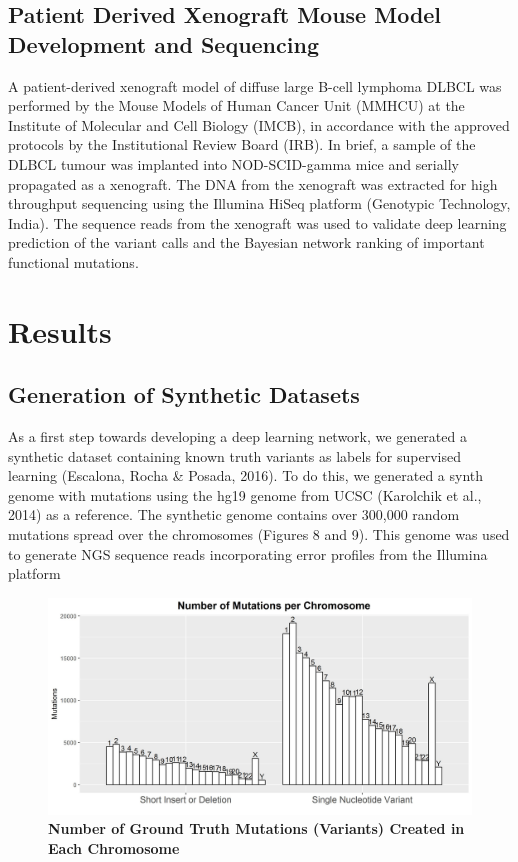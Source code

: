 \documentclass{article}
\begin{document}
\subsection{Patient Derived Xenograft Mouse Model Development and Sequencing}
A patient-derived xenograft model of diffuse large B-cell lymphoma DLBCL was performed by the Mouse Models of Human Cancer Unit (MMHCU) at the Institute of Molecular and Cell Biology (IMCB), in accordance with the approved protocols by the Institutional Review Board (IRB). In brief, a sample of the DLBCL tumour was implanted into NOD-SCID-gamma mice and serially propagated as a xenograft. The DNA from the xenograft was extracted for high throughput sequencing using the Illumina HiSeq platform (Genotypic Technology, India). The sequence reads from the xenograft was used to validate deep learning prediction of the variant calls and the Bayesian network ranking of important functional mutations. 
\newpage
\section{Results}
\subsection{Generation of Synthetic Datasets}
As a first step towards developing a deep learning network, we generated a synthetic dataset containing known truth variants as labels for supervised learning (Escalona, Rocha \& Posada, 2016). To do this, we generated a synth genome with mutations using the hg19 genome from UCSC (Karolchik et al., 2014) as a reference. The synthetic genome contains over 300,000 random mutations spread over the chromosomes (Figures 8 and 9). This genome was used to generate NGS sequence reads incorporating error profiles from the Illumina platform


\begin{figure}[H]
\centering
\includegraphics[width=\textwidth]{MutationInSimulatedGenome.jpg}
\caption{\textbf{Number of Ground Truth Mutations (Variants) Created in Each Chromosome}}
\end{figure}
\end{document}

